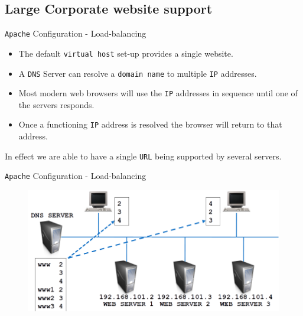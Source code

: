 \documentclass[xcolor=table]{beamer}
\begin{document}
\subsection{Large Corporate website support}
\begin{frame}{\texttt{Apache} Configuration - Load-balancing}
  \begin{itemize}
    \item The default \texttt{virtual host} set-up provides a single website.
    \item A \texttt{DNS} Server can resolve a \texttt{domain name} to multiple \texttt{IP} addresses.
    \item Most modern web browsers will use the \texttt{IP} addresses in sequence until one of the servers responds.
    \item Once a functioning \texttt{IP} address is resolved the browser will return to that address.
  \end{itemize}
  \begin{tcolorbox}
    \begin{center}
      \scriptsize In effect we are able to have a single \texttt{URL} being supported by several servers.
    \end{center}
  \end{tcolorbox}
\end{frame}

\begin{frame}{\texttt{Apache} Configuration - Load-balancing}
  \begin{figure}
    \begin{center}
      \includegraphics[width=1\linewidth]{LoadBalanced.png}
    \end{center}
  \end{figure}
\end{frame}
\end{document}
